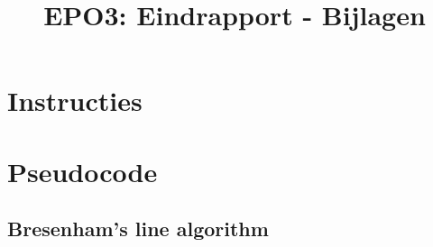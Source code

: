 \documentclass{scrartcl}
\author{}
\title{EPO3: Eindrapport - Bijlagen}
\begin{document}
\begin{appendices}

\chapter{Instructies}
\label{app:instructies}

\chapter{Pseudocode}
\label{app:pseudocode}
\section{Bresenham's line algorithm}
\label{appsec:pseudocode-bresenham-line}

\end{appendices}
\end{document}
